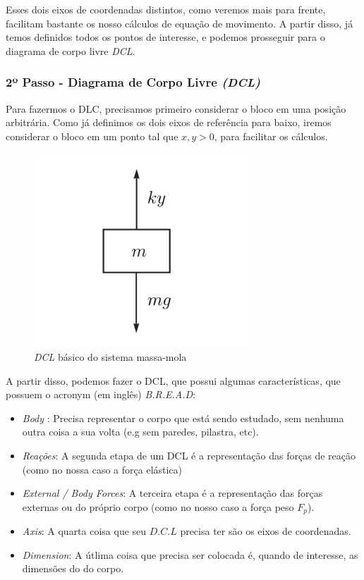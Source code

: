 \documentclass{article}
\begin{document}
                    Esses dois eixos de coordenadas distintos, como veremos mais para frente, facilitam bastante os nosso cálculos de equação de movimento.
                    A partir disso, já temos definidos todos os pontos de interesse, e podemos prosseguir para o diagrama de corpo livre \emph{DCL}.

                \subsubsection*{2º Passo - Diagrama de Corpo Livre \emph{(DCL)}}

                    Para fazermos o DLC, precisamos primeiro considerar o bloco em uma posição arbitrária. Como já definimos os dois eixos de referência para baixo, iremos considerar o bloco em um
                    ponto tal que $x,y>0$, para facilitar os cálculos.

                    \begin{figure}[h]
                        \centering
                        \includegraphics[width=.3\linewidth]{imgs/sis_mass_mola_1_dcl.png}
                        \caption{\emph{DCL} básico do sistema massa-mola}
                    \end{figure}

                    A partir disso, podemos fazer o DCL, que possui algumas características, que possuem o acronym (em inglês) \emph{B.R.E.A.D}:
                    \begin{itemize}
                        \item \emph{Body} : Precisa representar o corpo que está sendo estudado, sem nenhuma outra coisa a sua volta (e.g sem paredes, pilastra, etc).
                        \item \emph{Reações}: A segunda etapa de um DCL é a representação das forças de reação (como no nossa caso a força elástica)
                        \item \emph{External / Body Forces}: A terceira etapa é a representação das forças externas ou do próprio corpo (como no nosso caso a força peso $F_p$).
                        \item \emph{Axis}: A quarta coisa que seu $D.C.L$ precisa ter são os eixos de coordenadas.
                        \item \emph{Dimension}: A útlima coisa que precisa ser colocada é, quando de interesse, as dimensões do do corpo.
                    \end{itemize}
\end{document}
